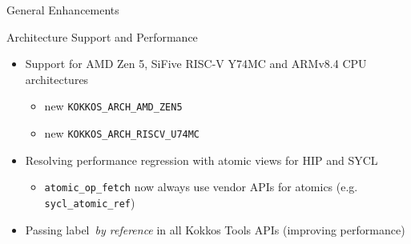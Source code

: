 
\begin{frame}[fragile]

  {\Huge General Enhancements}

  \vspace{10pt}

\end{frame}




\begin{frame}[fragile]{Architecture Support and Performance}
 \begin{itemize}
     \item Support for AMD Zen 5, SiFive RISC-V Y74MC and ARMv8.4 CPU architectures
     \begin{itemize}
       \item new \texttt{KOKKOS\_ARCH\_AMD\_ZEN5} 
       \item new \texttt{KOKKOS\_ARCH\_RISCV\_U74MC}
     \end{itemize}
     \item {Resolving performance regression with atomic views for HIP and SYCL}
     \begin{itemize}
       \item \texttt{atomic\_op\_fetch} now always use vendor APIs for atomics (e.g. \texttt{sycl\_atomic\_ref})
     \end{itemize}
     \item Passing label~\emph{by reference} in all Kokkos Tools APIs (improving performance)
 \end{itemize}
\end{frame}

